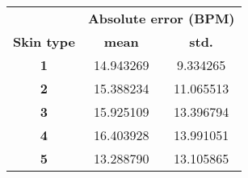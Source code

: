 
\begin{tabular}{c|cc}
\hline
\textbf{}          & \multicolumn{2}{c}{\textbf{Absolute error (BPM)}}  \\
\textbf{Skin type} & \multicolumn{1}{c|}{\textbf{mean}} & \textbf{std.} \\ \hline
\textbf{1}         & \multicolumn{1}{c|}{14.943269}     & 9.334265      \\
\textbf{2}         & \multicolumn{1}{c|}{15.388234}     & 11.065513     \\
\textbf{3}         & \multicolumn{1}{c|}{15.925109}     & 13.396794     \\
\textbf{4}         & \multicolumn{1}{c|}{16.403928}     & 13.991051     \\
\textbf{5}         & \multicolumn{1}{c|}{13.288790}     & 13.105865     \\ \hline
\end{tabular}
